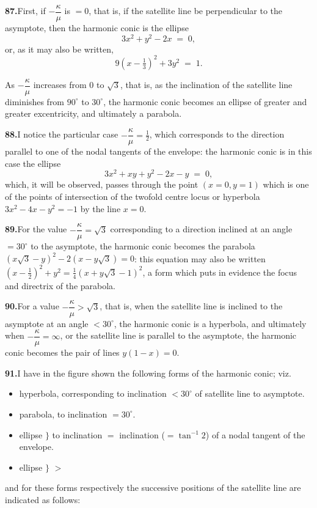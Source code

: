 \documentclass[11pt]{article}
\begin{document}
\medskip
\textbf{87.}\quad First, if $-\dfrac{\kappa}{\mu}$ is $= 0$, that is, if the satellite line be perpendicular to the asymptote, then the harmonic conic is the ellipse
\[
3 x^{2} + y^{2} - 2 x \;=\; 0,
\]
or, as it may also be written,
\[
9(x - \tfrac{1}{3})^{2} + 3 y^{2} \;=\; 1.
\]

As $-\dfrac{\kappa}{\mu}$ increases from $0$ to $\sqrt{3}$, that is, as the inclination of the satellite line diminishes from $90^{\circ}$ to $30^{\circ}$, the harmonic conic becomes an ellipse of greater and greater excentricity, and ultimately a parabola.

\medskip
\textbf{88.}\quad I notice the particular case $-\dfrac{\kappa}{\mu} = \tfrac{1}{2}$, which corresponds to the direction parallel to one of the nodal tangents of the envelope: the harmonic conic is in this case the ellipse
\[
3 x^{2} + x y + y^{2} - 2 x - y \;=\; 0,
\]
which, it will be observed, passes through the point $(x = 0, y = 1)$ which is one of the points of intersection of the twofold centre locus or hyperbola $3 x^{2} - 4 x - y^{2} = -1$ by the line $x = 0$.

\medskip
\textbf{89.}\quad For the value $-\dfrac{\kappa}{\mu} = \sqrt{3}$ corresponding to a direction inclined at an angle $= 30^{\circ}$ to the asymptote, the harmonic conic becomes the parabola $(x\sqrt{3} - y)^{2} - 2(x - y\sqrt{3}) = 0$: this equation may also be written $(x - \tfrac{1}{2})^{2} + y^{2} = \tfrac{1}{4}(x + y\sqrt{3} - 1)^{2}$, a form which puts in evidence the focus and directrix of the parabola.

\medskip
\textbf{90.}\quad For a value $-\dfrac{\kappa}{\mu} > \sqrt{3}$, that is, when the satellite line is inclined to the asymptote at an angle $< 30^{\circ}$, the harmonic conic is a hyperbola, and ultimately when $-\dfrac{\kappa}{\mu} = \infty$, or the satellite line is parallel to the asymptote, the harmonic conic becomes the pair of lines $y(1 - x) = 0$.

\medskip
\textbf{91.}\quad I have in the figure shown the following forms of the harmonic conic; viz.
\begin{itemize}\itemsep0pt
\item hyperbola, corresponding to inclination $< 30^{\circ}$ of satellite line to asymptote.
\item parabola, to inclination $= 30^{\circ}$.
\item ellipse $\big\}$ to inclination $=$ inclination ($= \tan^{-1} 2$) of a nodal tangent of the envelope.
\item ellipse $\big\}$ $>$
\end{itemize}
and for these forms respectively the successive positions of the satellite line are indicated as follows:
\end{document}
